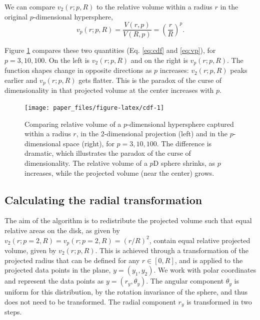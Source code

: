 \documentclass[]{interact}
\theoremstyle{plain}%
\theoremstyle{definition}
\theoremstyle{remark}
\begin{document}
We can compare \(v_{2} (r; p, R)\) to the relative volume within a
radius \(r\) in the original \(p\)-dimensional hypersphere,
\begin{equation}
v_{p} (r; p, R) = \frac{V(r, p)}{V(R, p)} = \left({\frac{r}{R}}\right)^p.
\label{eq:vp}
\end{equation}

Figure \ref{fig:cdf} compares these two quantities (Eq. \ref{eq:cdf} and
\ref{eq:vp}), for \(p=3, 10, 100\). On the left is \(v_{2} (r; p, R)\)
and on the right is \(v_{p} (r; p, R)\). The function shapes change in
opposite directions as \(p\) increases: \(v_{2} (r; p, R)\) peaks
earlier and \(v_{p} (r; p, R)\) gets flatter. This is the paradox of the
curse of dimensionality in that projected volume at the center increases
with \(p\).

\begin{figure}

{\centering \texttt{[image: paper\_files/figure-latex/cdf-1]} 

}

\caption{Comparing relative volume of a $p$-dimensional hypersphere captured within a radius $r$, in the 2-dimensional projection (left) and in the $p$-dimensional space (right), for $p=3, 10, 100$. The difference is dramatic, which illustrates the paradox of the curse of dimensionality. The relative volume of a $p$D sphere shrinks, as $p$ increases, while the projected volume (near the center) grows.}\label{fig:cdf}
\end{figure}

\hypertarget{calculating-the-radial-transformation}{%
\subsection{Calculating the radial
transformation}\label{calculating-the-radial-transformation}}

The aim of the algorithm is to redistribute the projected volume such
that equal relative areas on the disk, as given by
\(v_{2} (r; p=2, R)= v_p(r; p=2, R) = (r/R)^2\), contain equal relative
projected volume, given by \(v_{2} (r; p, R)\). This is achieved through
a transformation of the projected radius that can be defined for any
\(r\in[0,R]\), and is applied to the projected data points in the plane,
\(y = (y_1, y_2)\). We work with polar coordinates and represent the
data points as \(y = (r_y, \theta_y)\). The angular component
\(\theta_y\) is uniform for this distribution, by the rotation
invariance of the sphere, and thus does not need to be transformed. The
radial component \(r_y\) is transformed in two steps.
\end{document}

